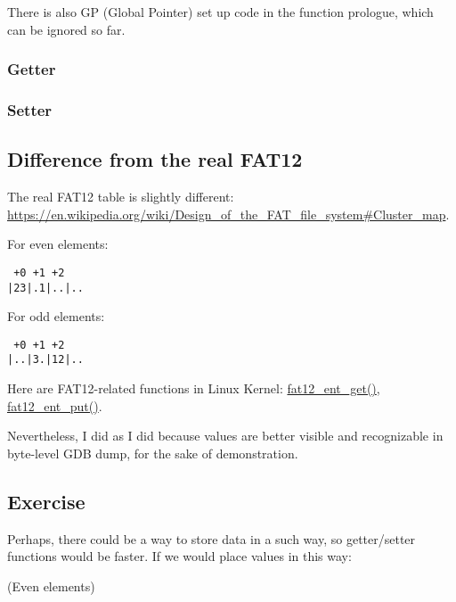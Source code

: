 There is also GP (Global Pointer) set up code in the function prologue, which can be ignored so far.

\subsubsection{Getter}



\subsubsection{Setter}



\subsection{Difference from the real FAT12}

The real FAT12 table is slightly different: \url{https://en.wikipedia.org/wiki/Design_of_the_FAT_file_system\#Cluster_map}.

For even elements:

\begin{lstlisting}
 +0 +1 +2
|23|.1|..|..
\end{lstlisting}

For odd elements:

\begin{lstlisting}
 +0 +1 +2
|..|3.|12|..
\end{lstlisting}

Here are FAT12-related functions in Linux Kernel:
\href{https://github.com/torvalds/linux/blob/de182468d1bb726198abaab315820542425270b7/fs/fat/fatent.c#L117}{fat12\_ent\_get()},
\href{https://github.com/torvalds/linux/blob/de182468d1bb726198abaab315820542425270b7/fs/fat/fatent.c#L153}{fat12\_ent\_put()}.

Nevertheless, I did as I did because values are better visible and recognizable in byte-level GDB dump, for the sake of demonstration.

\subsection{Exercise}

Perhaps, there could be a way to store data in a such way, so getter/setter functions would be faster.
If we would place values in this way:

(Even elements)

